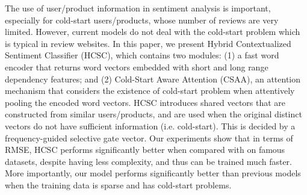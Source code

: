 The use of user/product information in sentiment analysis is important, especially for cold-start users/products, whose number of reviews are very limited. However, current models do not deal with the cold-start problem which is typical in review websites. In this paper, we present Hybrid Contextualized Sentiment Classifier (HCSC), which contains two modules: (1) a fast word encoder that returns word vectors embedded with short and long range dependency features; and (2) Cold-Start Aware Attention (CSAA), an attention mechanism that considers the existence of cold-start problem when attentively pooling the encoded word vectors. HCSC introduces shared vectors that are constructed from similar users/products, and are used when the original distinct vectors do not have sufficient information (i.e. cold-start). This is decided by a frequency-guided selective gate vector. Our experiments show that in terms of RMSE, HCSC performs significantly better when compared with on famous datasets, despite having less complexity, and thus can be trained much faster. More importantly, our model performs significantly better than previous models when the training data is sparse and has cold-start problems.

